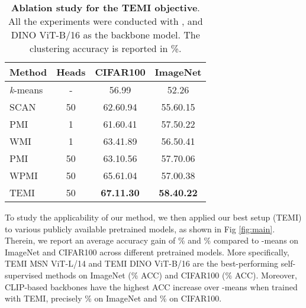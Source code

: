 \documentclass{bmvc2k}
\begin{document}
\begin{wraptable}{O}{.55\textwidth}

 \begin{center}
  \begin{tabular}{lccc}
    \toprule
    Method  & Heads & CIFAR100 & ImageNet  \\
    \midrule
    \textit{k}-means & - & 56.99 & 52.26  \\
    SCAN & 50 & 62.60.94 & 55.60.15 \\
    \hline
    PMI & 1 & 61.60.41 & 57.50.22  \\
    WMI & 1 & 63.41.89 & 56.50.41 \\
    \hline
    PMI & 50 & 63.10.56 & 57.70.06  \\
    WPMI & 50 & 65.61.04 & 57.00.38 \\
    TEMI & 50 & \textbf{67.11.30} & \textbf{58.40.22}  \\
    
    \bottomrule
  \end{tabular}
  \end{center}
    \caption{\textbf{Ablation study for the TEMI objective}. All the experiments were conducted with , and DINO ViT-B/16 as the backbone model. The clustering accuracy is reported in \%.}
    \label{table:losses}
\end{wraptable} 


To study the applicability of our method, we then applied our best setup (TEMI) to various publicly available pretrained models, as shown in Fig \ref{fig:main}. Therein, we report an average accuracy gain of \% and \% compared to -means on ImageNet and CIFAR100 across  different pretrained models. More specifically, TEMI MSN ViT-L/14 and TEMI DINO ViT-B/16 are the best-performing self-supervised methods on ImageNet (\% ACC) and CIFAR100 (\% ACC). Moreover, CLIP-based backbones have the highest ACC increase over -means when trained with TEMI, precisely \% on ImageNet and \% on CIFAR100.
\end{document}

